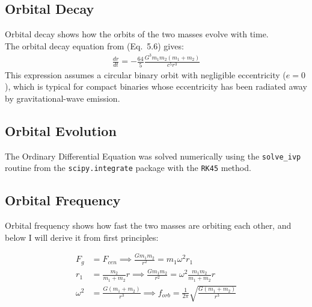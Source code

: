 \documentclass[12pt]{article}
\begin{document}
\subsection{Orbital Decay}
Orbital decay shows how the orbits of the two masses evolve with time.
\\The orbital decay equation from \cite{Peters1964} (Eq.~5.6) gives:
\begin{align}
    \frac{dr}{dt} = -\frac{64}{5} \frac{G^3 m_1 m_2 (m_1 + m_2)}{c^5 r^3}
    \label{eq:Decay}
\end{align}
This expression assumes a circular binary orbit with negligible eccentricity ($e=0$), which is typical for compact binaries whose eccentricity has been radiated away by gravitational-wave emission.

\subsection{Orbital Evolution}
The Ordinary Differential Equation was solved numerically using the \texttt{solve\_ivp} routine from the \texttt{scipy.integrate} package with the \texttt{RK45} method.

\subsection{Orbital Frequency}
Orbital frequency shows how fast the two masses are orbiting each other, and below I will derive it from first principles:

\begin{align}
    F_g &= F_{cen} \implies \frac{Gm_1m_2}{r^2} = m_1 \omega^2 r_1 \\
    r_1 &= \frac{m_2}{m_1+m_2}r 
    \implies 
    \frac{Gm_1m_2}{r^2} = \omega^2 \frac{m_1m_2}{m_1+m_2}r \\
    \omega^2 &= \frac{G(m_1 + m_2)}{r^3}
    \implies f_{orb} = \frac{1}{2\pi} 
    \sqrt{\frac{G(m_1 + m_2)}{r^3}} \label{eq:frequency}
\end{align}
\end{document}
